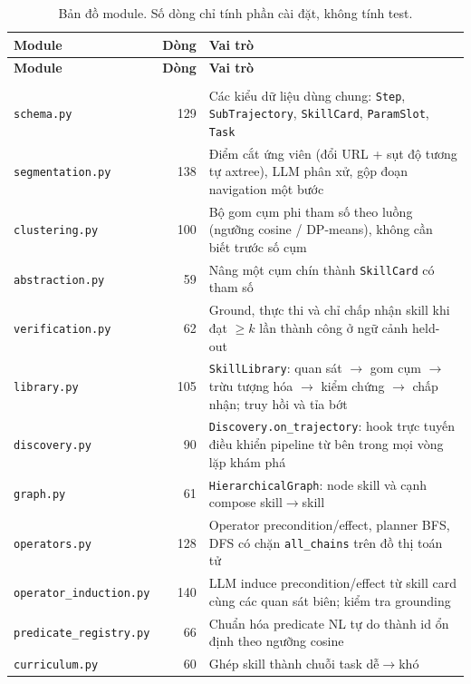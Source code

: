 {\footnotesize
\setlength{\LTcapwidth}{\textwidth}
\begin{longtable}{@{}L{4.3cm}rL{8.0cm}@{}}
\caption[Bản đồ module của phần cài đặt HSGE]{Bản đồ module. Số dòng chỉ tính phần cài đặt, không tính test.}
\label{tab:app-modules}\\
\toprule
\textbf{Module} & \textbf{Dòng} & \textbf{Vai trò} \\
\midrule
\endfirsthead
\toprule
\textbf{Module} & \textbf{Dòng} & \textbf{Vai trò} \\
\midrule
\endhead
\bottomrule
\endfoot
{} \\
\midrule
\texttt{schema.py}      & 129 & Các kiểu dữ liệu dùng chung: \texttt{Step},
\texttt{SubTrajectory}, \texttt{SkillCard}, \texttt{ParamSlot}, \texttt{Task} \\
\texttt{segmentation.py} & 138 & Điểm cắt ứng viên (đổi URL + sụt độ tương tự
axtree), LLM phân xử, gộp đoạn navigation một bước \\
\texttt{clustering.py}  & 100 & Bộ gom cụm phi tham số theo luồng
(ngưỡng cosine / DP-means), không cần biết trước số cụm \\
\texttt{abstraction.py} &  59 & Nâng một cụm chín thành \texttt{SkillCard}
có tham số \\
\texttt{verification.py} &  62 & Ground, thực thi và chỉ chấp nhận skill khi
đạt $\geq k$ lần thành công ở ngữ cảnh held-out \\
\texttt{library.py}     & 105 & \texttt{SkillLibrary}: quan sát $\rightarrow$
gom cụm $\rightarrow$ trừu tượng hóa $\rightarrow$ kiểm chứng $\rightarrow$
chấp nhận; truy hồi và tỉa bớt \\
\texttt{discovery.py}   &  90 & \texttt{Discovery.on\_trajectory}: hook trực
tuyến điều khiển pipeline từ bên trong mọi vòng lặp khám phá \\
\texttt{graph.py}       &  61 & \texttt{HierarchicalGraph}: node skill và cạnh
compose skill$\rightarrow$skill \\
\texttt{operators.py}   & 128 & Operator precondition/effect, planner BFS,
DFS có chặn \texttt{all\_chains} trên đồ thị toán tử \\
\texttt{operator\_induction.py} & 140 & LLM induce precondition/effect từ
skill card cùng các quan sát biên; kiểm tra grounding \\
\texttt{predicate\_registry.py} &  66 & Chuẩn hóa predicate NL tự do thành id
ổn định theo ngưỡng cosine \\
\texttt{curriculum.py}  &  60 & Ghép skill thành chuỗi task dễ$\rightarrow$khó \\

\end{longtable}}
